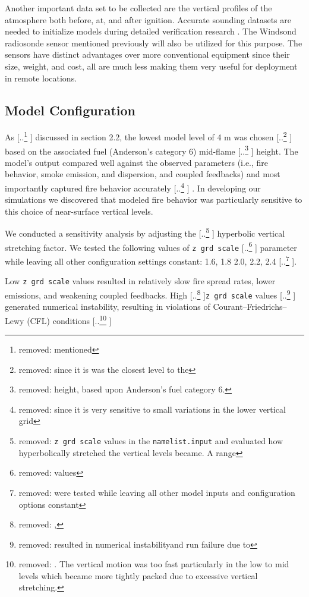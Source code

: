\documentclass[preprints,article,accept,moreauthors,pdftex]{Definitions/mdpi}
\providecommand{\DIFadd}[1]{{\protect\color{blue} \sf #1}} %
\providecommand{\DIFdel}[1]{{\protect\color{red} [..\footnote{removed: #1} ]}} %
\providecommand{\DIFaddbegin}{} %
\providecommand{\DIFaddend}{} %
\providecommand{\DIFdelbegin}{} %
\providecommand{\DIFdelend}{} %
\begin{document}
Another important data set to be collected are the vertical profiles of the atmosphere both before, at, and after ignition. Accurate sounding datasets are needed to initialize models during detailed verification research \cite{kochanski_experimental_2018,moisseeva_capturing_2019}. The Windsond radiosonde sensor mentioned previously will also be utilized for this purpose. The sensors have distinct advantages over more conventional equipment since their size, weight, and cost, all are much less making them very useful for deployment in remote locations.

\subsection{Model Configuration}

As \DIFdelbegin \DIFdel{mentioned }\DIFdelend \DIFaddbegin \DIFadd{discussed }\DIFaddend in section 2.2, the lowest model level of 4 m was chosen \DIFdelbegin \DIFdel{since it is was the closest level to the }\DIFdelend \DIFaddbegin \DIFadd{based on  the associated fuel (Anderson's category 6) }\DIFaddend mid-flame \DIFdelbegin \DIFdel{height, based upon Anderson’s fuel category 6. }\DIFdelend \DIFaddbegin \DIFadd{height. }\DIFaddend The model’s output compared well against the observed parameters (i.e., fire behavior, smoke emission, and dispersion, and coupled feedbacks) and most importantly captured fire behavior accurately\DIFdelbegin \DIFdel{since it is very sensitive to small variations in the lower vertical grid }\DIFdelend \DIFaddbegin \DIFadd{. In developing our simulations we discovered that modeled fire behavior was particularly sensitive to this choice of near-surface vertical }\DIFaddend levels.

We conducted a sensitivity analysis by adjusting the \DIFdelbegin \DIFdel{\texttt{z grd scale} values in the \texttt{namelist.input} and evaluated how hyperbolically stretched the vertical levels became. A range }\DIFdelend \DIFaddbegin \DIFadd{hyperbolic vertical stretching factor. We tested the following values }\DIFaddend of \texttt{z grd scale} \DIFdelbegin \DIFdel{values }\DIFdelend \DIFaddbegin \DIFadd{parameter while leaving all other configuration settings constant: }\DIFaddend 1.6, 1.8 2.0, 2.2, 2.4\DIFdelbegin \DIFdel{were tested while leaving all other model inputs and configuration options constant}\DIFdelend .

Low \texttt{z grd scale} values resulted in relatively slow fire spread rates, lower emissions, and weakening coupled feedbacks. High \DIFdelbegin \DIFdel{, }\DIFdelend \texttt{z grd scale} values \DIFdelbegin \DIFdel{resulted in numerical instabilityand run failure due to }\DIFdelend \DIFaddbegin \DIFadd{generated numerical instability, resulting in }\DIFaddend violations of Courant–Friedrichs–Lewy (CFL) conditions \DIFdelbegin \DIFdel{. The vertical motion was too fast particularly in the low to mid levels which became more tightly packed due to excessive vertical stretching.
}%
\end{document}
